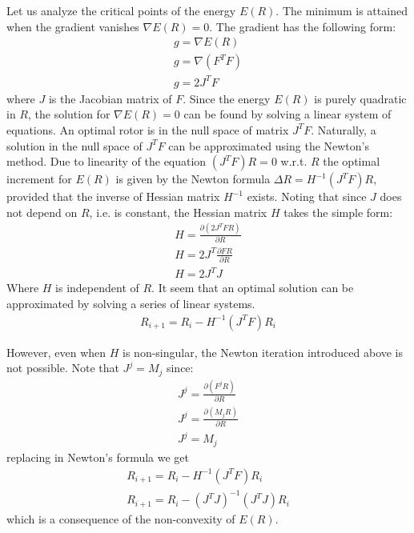 \documentclass{birkjour}
\numberwithin{equation}{section}
\begin{document}
Let us analyze the critical points of the energy $E(R)$. The minimum is attained when the gradient vanishes $\nabla E(R) = 0$. The gradient has the following form:
\begin{eqnarray*}
g = \nabla E(R)\\
g = \nabla (F^T F)\\
g = 2 J^T F
\end{eqnarray*}
where $J$ is the Jacobian matrix of $F$. Since the energy $E(R)$ is purely quadratic in $R$, the solution for $\nabla E(R) = 0$ can be found by solving a linear system of equations. An optimal rotor is in the null space of matrix $J^T F$. Naturally, a solution in the null space of $J^T F$ can be approximated using the Newton's method. Due to linearity of the equation $(J^T F) R = 0$ w.r.t. $R$ the optimal increment for $E(R)$ is given by the Newton formula $\Delta R = H^{-1} (J^T F) R$, provided that the inverse of Hessian matrix $H^{-1}$ exists. Noting that since $J$ does not depend on $R$, i.e. is constant, the Hessian matrix $H$ takes the simple form:
\begin{eqnarray*}
H = \frac{\partial(2 J^T F R)}{\partial R} \\
H = 2 J^T \frac{\partial F R}{\partial R}\\
H = 2 J^T J
\end{eqnarray*}
Where $H$ is independent of $R$. It seem that an optimal solution can be approximated by solving a series of linear systems.
\begin{eqnarray*}
R_{i+1} = R_i - H^{-1} (J^T F) R_i
\end{eqnarray*}

However, even when $H$ is non-singular, the Newton iteration introduced above is not possible. Note that $J^j = M_j$ since:
\begin{eqnarray*}
J^j = \frac{\partial(F^j R)}{\partial R}\\
J^j = \frac{\partial(M_j R )}{\partial R}\\
J^j = M_j
\end{eqnarray*}
replacing in Newton's formula we get
\begin{eqnarray*}
R_{i+1} = R_i - H^{-1} (J^T F) R_i\\
R_{i+1} = R_i - (J^T J)^{-1} (J^T J) R_i
\end{eqnarray*}
which is a consequence of the non-convexity of $E(R)$.
\end{document}
